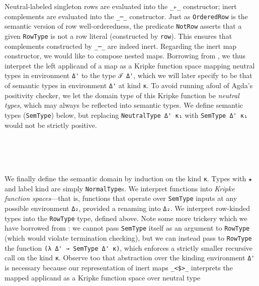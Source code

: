 \documentclass[authoryear, acmsmall, screen, review, nonacm]{acmart} %
\begin{document}
Neutral-labeled singleton rows are evaluated into the \verb!_▹_! constructor; inert complements are evaluated into the \verb!_─_! constructor. Just as \verb!OrderedRow! is the semantic version of row well-orderedness, the predicate \verb!NotRow! asserts that a given \verb!RowType! is not a row literal (constructed by \verb!row!). This ensures that complements constructed by \verb!_─_! are indeed inert. Regarding the inert map constructor, we would like to compose nested maps. Borrowing from \citet{AllaisBM13}, we thus interpret the left applicand of a map as a Kripke function space mapping neutral types in environment \verb!Δ'! to the type \verb!𝒯 Δ'!, which we will later specify to be that of semantic types in environment \verb!Δ'! at kind \verb!κ!. To avoid running afoul of Agda's positivity checker, we let the domain type of this Kripke function be \emph{neutral types}, which may always be reflected into semantic types. We define semantic types (\verb!SemType!) below, but replacing \verb!NeutralType Δ' κ₁! with \verb!SemType Δ' κ₁! would not be strictly positive. 
\begin{code}[hide]%
\>[0]\AgdaSpace{}%
\AgdaSymbol{(}\AgdaSpace{}%
\AgdaSpace{}%
\AgdaSymbol{)}\AgdaSpace{}%
\AgdaSymbol{=}\AgdaSpace{}%
\<%
\\
\>[0]\AgdaSpace{}%
\AgdaSymbol{(}\AgdaSpace{}%
\AgdaSpace{}%
\AgdaSymbol{)}\AgdaSpace{}%
\AgdaSymbol{=}\AgdaSpace{}%
\<%
\\
\>[0]\AgdaSpace{}%
\AgdaSymbol{(}\AgdaSpace{}%
\AgdaSpace{}%
\AgdaSymbol{)}\AgdaSpace{}%
\AgdaSymbol{=}\AgdaSpace{}%
\<%
\\
\>[0]\AgdaSpace{}%
\AgdaSymbol{(}\AgdaSpace{}%
\AgdaOperator{\AgdaInductiveConstructor{<\$>}}\AgdaSpace{}%
\AgdaSymbol{)}\AgdaSpace{}%
\AgdaSymbol{=}\AgdaSpace{}%
\<%
\end{code}

We finally define the semantic domain by induction on the kind \verb!κ!. Types with \verb!★! and label kind are simply \verb!NormalType!s. We interpret functions into \emph{Kripke function spaces}---that is, functions that operate over \verb!SemType! inputs at any possible environment \verb!Δ₂!, provided a renaming into \verb!Δ₂!. We interpret row-kinded types into the \verb!RowType! type, defined above. Note some more trickery which we have borrowed from \citet{AllaisBM13}: we cannot pass \verb!SemType! itself as an argument to \verb!RowType! (which would violate termination checking), but we can instead pass to \verb!RowType! the function \verb!(λ Δ' → SemType Δ' κ)!, which enforces a strictly smaller recursive call on the kind \verb!κ!. Observe too that abstraction over the kinding environment \verb!Δ'! is necessary because our representation of inert maps \verb!_<$>_! interprets the mapped applicand as a Kripke function space over neutral type 
\end{document}
